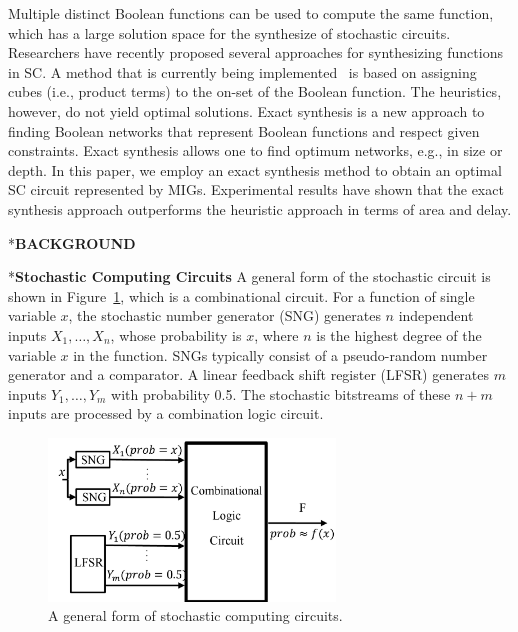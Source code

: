 \documentclass[conference,letterpaper]{IEEEtran}
\makeatletter
\renewcommand{\section}{\@startsection{section}{1}{0mm}
    {-\baselineskip}{0.001\baselineskip}{\bf\leftline}}
\renewcommand{\subsection}{\@startsection{subsection}{1}{0mm}
	{-\baselineskip}{0.001\baselineskip}{\bf\leftline}}
\makeatother
\begin{document}
Multiple distinct Boolean functions can be used to compute the same function, which has a large solution space for the synthesize of stochastic circuits. 
Researchers have recently proposed several approaches for synthesizing functions in SC. 
A method that is currently being implemented~\cite{Cube-Assignment} is based on assigning cubes (i.e., product terms) to the on-set of the Boolean function. The heuristics, however, do not yield optimal solutions. Exact synthesis is a new approach to finding Boolean networks that represent Boolean functions and respect given constraints. Exact synthesis allows one to find optimum networks, e.g., in size or depth. In this paper, we employ an exact synthesis method to obtain an optimal SC circuit represented by MIGs. Experimental results have shown that the exact synthesis approach outperforms the heuristic approach in terms of area and delay.

\vspace{2ex}

\section*{\textbf{\large BACKGROUND}}
\subsection*{\textbf{Stochastic Computing Circuits }}
A general form of the stochastic circuit is shown in Figure~\ref{fig2}, which is a combinational circuit. For a function of single variable $x$, the stochastic number generator (SNG) generates $n$ independent inputs $X_{1}, \ldots, X_{n}$, whose probability is $x$, where $n$ is the highest degree of the variable $x$ in the function. SNGs typically consist of a pseudo-random number generator and a comparator. A linear feedback shift register (LFSR) generates $m$ inputs $Y_1, \ldots, Y_m$ with probability 0.5. The stochastic bitstreams of these $n+m$ inputs are processed by a combination logic circuit.

\begin{figure}[t]
	\centering
	\includegraphics[width=3in]{fig/sc.pdf}	
	\caption{\label{fig2}A general form of stochastic computing circuits.} \vspace{-2ex}
\end{figure}
\end{document}
